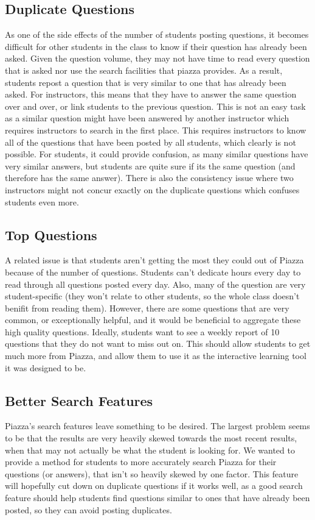 \documentclass[sigconf]{acmart}
\begin{document}
\subsection{Duplicate Questions}
As one of the side effects of the number of students posting questions, it becomes difficult for other students in the class to know if their question has already been asked. Given the question volume, they may not have time to read every question that is asked nor use the search facilities that piazza provides. As a result, students repost a question that is very similar to one that has already been asked. For instructors, this means that they have to answer the same question over and over, or link students to the previous question. This is not an easy task as a similar question might have been answered by another instructor which requires instructors to search in the first place. This requires instructors to know all of the questions that have been posted by all students, which clearly is not possible. For students, it could provide confusion, as many similar questions have very similar answers, but students are quite sure if its the same question (and therefore has the same answer). There is also the consistency issue where two instructors might not concur exactly on the duplicate questions which confuses students even more.

\subsection{Top Questions}
A related issue is that students aren't getting the most they could out of Piazza because of the number of questions. Students can't dedicate hours every day to read through all questions posted every day. Also, many of the question are very student-specific (they won't relate to other students, so the whole class doesn't benifit from reading them). However, there are some questions that are very common, or exceptionally helpful, and it would be beneficial to aggregate these high quality questions. Ideally, students want to see a weekly report of 10 questions that they do not want to miss out on. This should allow students to get much more from Piazza, and allow them to use it as the interactive learning tool it was designed to be.

\subsection{Better Search Features}
Piazza's search features leave something to be desired. The largest problem seems to be that the results are very heavily skewed towards the most recent results, when that may not actually be what the student is looking for. We wanted to provide a method for students to more accurately search Piazza for their questions (or answers), that isn't so heavily skewed by one factor. This feature will hopefully cut down on duplicate questions if it works well, as a good search feature should help students find questions similar to ones that have already been posted, so they can avoid posting duplicates.
\end{document}
